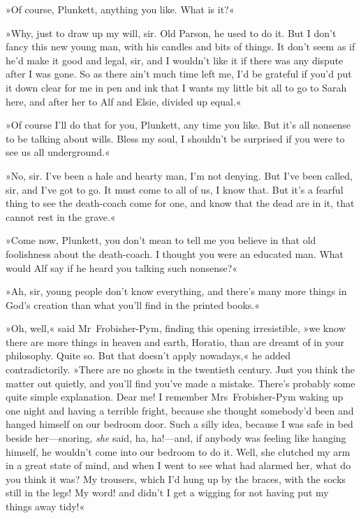 »Of course, Plunkett, anything you like. What is it?«

»Why, just to draw up my will, sir. Old Parson, he used to do it. But I don't fancy this new young man, with his candles and bits of things. It don't seem as if he'd make it good and legal, sir, and I wouldn't like it if there was any dispute after I was gone. So as there ain't much time left me, I'd be grateful if you'd put it down clear for me in pen and ink that I wants my little bit all to go to Sarah here, and after her to Alf and Elsie, divided up equal.«

»Of course I'll do that for you, Plunkett, any time you like. But it's all nonsense to be talking about wills. Bless my soul, I shouldn't be surprised if you were to see us all underground.«

»No, sir. I've been a hale and hearty man, I'm not denying. But I've been called, sir, and I've got to go. It must come to all of us, I know that. But it's a fearful thing to see the death-coach come for one, and know that the dead are in it, that cannot rest in the grave.«

»Come now, Plunkett, you don't mean to tell me you believe in that old foolishness about the death-coach. I thought you were an educated man. What would Alf say if he heard you talking such nonsense?«

»Ah, sir, young people don't know everything, and there's many more things in God's creation than what you'll find in the printed books.«

»Oh, well,« said Mr~Frobisher-Pym, finding this opening irresistible, »we know there are more things in heaven and earth, Horatio, than are dreamt of in your philosophy. Quite so. But that doesn't apply nowadays,« he added contradictorily. »There are no ghosts in the twentieth century. Just you think the matter out quietly, and you'll find you've made a mistake. There's probably some quite simple explanation. Dear me! I remember Mrs~Frobisher-Pym waking up one night and having a terrible fright, because she thought somebody'd been and hanged himself on our bedroom door. Such a silly idea, because I was safe in bed beside her—snoring, \textit{she} said, ha, ha!—and, if anybody was feeling like hanging himself, he wouldn't come into our bedroom to do it. Well, she clutched my arm in a great state of mind, and when I went to see what had alarmed her, what do you think it was? My trousers, which I'd hung up by the braces, with the socks still in the legs! My word! and didn't I get a wigging for not having put my things away tidy!«


